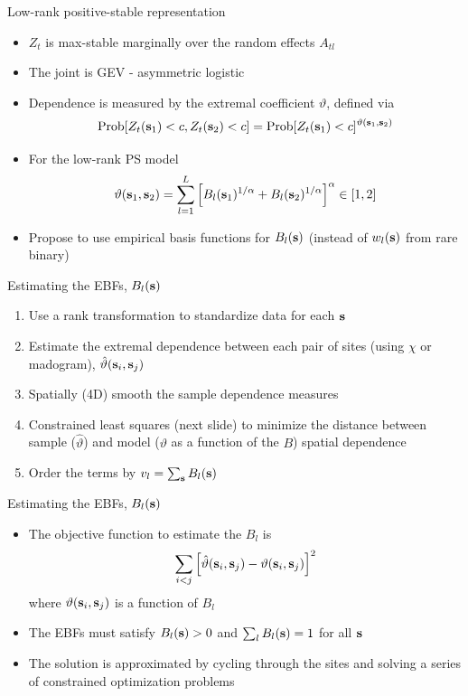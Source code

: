 \documentclass{beamer}
\begin{document}
\begin{frame}{Low-rank positive-stable representation}
	\begin{itemize}\setlength{\itemsep}{1em}
		\item $Z_t$ is max-stable marginally over the random effects $A_{tl}$
		\item The joint is GEV - asymmetric logistic
		\item Dependence is measured by the extremal coefficient $\vartheta$, defined via $$\mbox{Prob}[Z_t(\mathbf{s}_1)<c, Z_t(\mathbf{s}_2)<c] = \mbox{Prob}[Z_t(\mathbf{s}_1)<c]^{\vartheta(\mathbf{s}_1,\mathbf{s}_2)}$$
		\item For the low-rank PS model $$\vartheta(\mathbf{s}_1,\mathbf{s}_2) = \sum_{l=1}^L\left[B_l(\mathbf{s}_1)^{1/\alpha}+B_l(\mathbf{s}_2)^{1/\alpha}\right]^{\alpha}\in[1,2] $$
		\item Propose to use empirical basis functions for $B_l(\mathbf{s})$ (instead of $w_l(\mathbf{s})$ from rare binary)
	\end{itemize}
\end{frame}


\begin{frame}{Estimating the EBFs, $B_l(\mathbf{s})$}
	\begin{enumerate}[1.]\setlength\itemsep{1em}
		\item Use a rank transformation to standardize data for each $\mathbf{s}$
		\item Estimate the extremal dependence between each pair of sites (using $\chi$ or madogram), ${\hat \vartheta}(\mathbf{s}_i,\mathbf{s}_j)$
		\item Spatially (4D) smooth the sample dependence measures
		\item Constrained least squares (next slide) to minimize the distance between sample (${\hat \vartheta}$) and model ($\vartheta$ as a function of the $B$) spatial dependence
		\item Order the terms by $v_l = \sum_{\mathbf{s}}B_l(\mathbf{s})$
	\end{enumerate}
\end{frame}


\begin{frame}{Estimating the EBFs, $B_l(\mathbf{s})$}
	\begin{itemize}\setlength\itemsep{1em}
		\item The objective function to estimate the $B_l$ is
		$$ \sum_{i<j}\left[\hat{\vartheta}(\mathbf{s}_i,\mathbf{s}_j) - \vartheta(\mathbf{s}_i,\mathbf{s}_j)\right]^2$$
		where $\vartheta(\mathbf{s}_i,\mathbf{s}_j)$ is a function of $B_l$
		\item The EBFs must satisfy $B_l(\mathbf{s})>0$ and $\sum_{l}B_l(\mathbf{s})=1$ for all $\mathbf{s}$
		\item The solution is approximated by cycling through the sites and solving a series of constrained optimization problems
	\end{itemize}
\end{frame}
\end{document}
